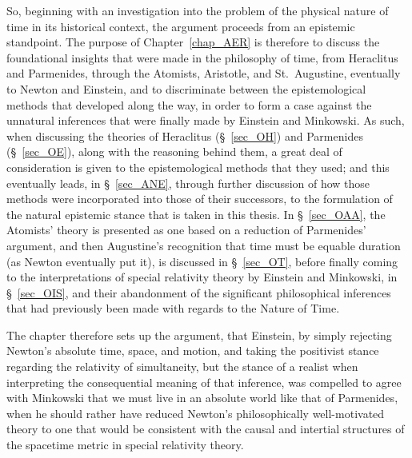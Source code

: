 So, beginning with an investigation into the problem of the physical nature of time in its historical context, the argument proceeds from an epistemic standpoint. The purpose of Chapter~\ref{chap_AER} is therefore to discuss the foundational insights that were made in the philosophy of time, from Heraclitus and Parmenides, through the Atomists, Aristotle, and St.~Augustine, eventually to Newton and Einstein, and to discriminate between the epistemological methods that developed along the way, in order to form a case against the unnatural inferences that were finally made by Einstein and Minkowski. As such, when discussing the theories of Heraclitus (\S~\ref{sec_OH}) and Parmenides (\S~\ref{sec_OE}), along with the reasoning behind them, a great deal of consideration is given to the epistemological methods that they used; and this eventually leads, in \S~\ref{sec_ANE}, through further discussion of how those methods were incorporated into those of their successors, to the formulation of the natural epistemic stance that is taken in this thesis. In \S~\ref{sec_OAA}, the Atomists' theory is presented as one based on a reduction of Parmenides' argument, and then Augustine's recognition that time must be equable duration (as Newton eventually put it), is discussed in \S~\ref{sec_OT}, before finally coming to the interpretations of special relativity theory by Einstein and Minkowski, in \S~\ref{sec_OIS}, and their abandonment of the significant philosophical inferences that had previously been made with regards to the Nature of Time.

The chapter therefore sets up the argument, that Einstein, by simply rejecting Newton's absolute time, space, and motion, and taking the positivist stance regarding the relativity of simultaneity, but the stance of a realist when interpreting the consequential meaning of that inference, was compelled to agree with Minkowski that we must live in an absolute world like that of Parmenides, when he should rather have reduced Newton's philosophically well-motivated theory to one that would be consistent with the causal and intertial structures of the spacetime metric in special relativity theory.


